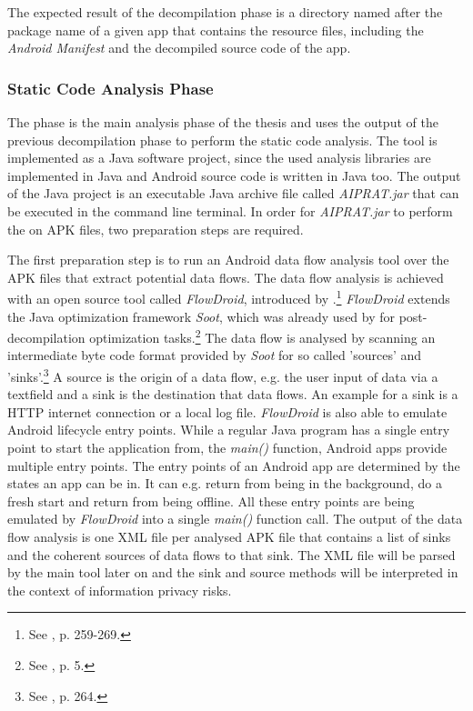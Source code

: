 The expected result of the decompilation phase is a directory named after the package name of a given app that contains the resource files, including the \textit{Android Manifest} and the decompiled source code of the app.

\subsubsection{Static Code Analysis Phase} \label{sssec:SCAP}

The \sca phase is the main analysis phase of the thesis and uses the output of the previous decompilation phase to perform the static code analysis.
The \sca tool is implemented as a Java software project, since the used analysis libraries are implemented in Java and Android source code is written in Java too.
The output of the \sca Java project is an executable Java archive file called \textit{AIPRAT.jar} that can be executed in the command line terminal.
In order for \textit{AIPRAT.jar} to perform the \sca on APK files, two preparation steps are required.

The first preparation step is to run an Android data flow analysis tool over the APK files that extract potential data flows.
The data flow analysis is achieved with an open source tool called \textit{FlowDroid}, introduced by \cite{Arzt2014}.\footnote{See \cite{Arzt2014}, p. 259-269.}
\textit{FlowDroid} extends the Java optimization framework \textit{Soot}, which was already used by \cite{Enck2011} for post-decompilation optimization tasks.\footnote{See \cite{Enck2011}, p. 5.}
The data flow is analysed by scanning an intermediate byte code format provided by \textit{Soot} for so called 'sources' and 'sinks'.\footnote{See \cite{Arzt2014}, p. 264.}
A source is the origin of a data flow, e.g. the user input of data via a textfield and a sink is the destination that data flows.
An example for a sink is a HTTP internet connection or a local log file.
\textit{FlowDroid} is also able to emulate Android lifecycle entry points.
While a regular Java program has a single entry point to start the application from, the \textit{main()} function, Android apps provide multiple entry points.
The entry points of an Android app are determined by the states an app can be in. 
It can e.g. return from being in the background, do a fresh start and return from being offline.
All these entry points are being emulated by \textit{FlowDroid} into a single \textit{main()} function call.
The output of the data flow analysis is one XML file per analysed APK file that contains a list of sinks and the coherent sources of data flows to that sink.
The XML file will be parsed by the main \sca tool later on and the sink and source methods will be interpreted in the context of information privacy risks.

